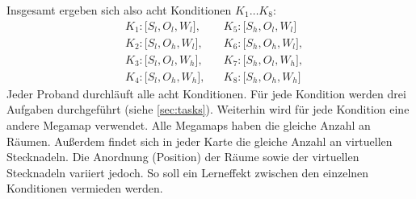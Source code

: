 \documentclass[
    draft=false,
    paper=a4,
    fontsize=12pt,
    twoside=false,
    captions=tableheading,
    british, ngerman,
]{scrartcl}
\begin{document}
Insgesamt ergeben sich also acht Konditionen $K_1 \dots K_8$:
\begin{align*}
    &K_1: \lbrack S_l, O_l, W_l \rbrack, && K_5: \lbrack S_h, O_l, W_l \rbrack\\
    &K_2: \lbrack S_l, O_h, W_l \rbrack, && K_6: \lbrack S_h, O_h, W_l \rbrack,\\
    &K_3: \lbrack S_l, O_l, W_h \rbrack, && K_7: \lbrack S_h, O_l, W_h \rbrack,\\
    &K_4: \lbrack S_l, O_h, W_h \rbrack, && K_8: \lbrack S_h, O_h, W_h \rbrack
\end{align*}
Jeder Proband durchläuft alle acht Konditionen.
Für jede Kondition werden drei Aufgaben durchgeführt (siehe \autoref{sec:tasks}).
Weiterhin wird für jede Kondition eine andere Megamap verwendet.
Alle Megamaps haben die gleiche Anzahl an Räumen.
Außerdem findet sich in jeder Karte die gleiche Anzahl an virtuellen Stecknadeln.
Die Anordnung (Position) der Räume sowie der virtuellen Stecknadeln variiert jedoch.
So soll ein Lerneffekt zwischen den einzelnen Konditionen vermieden werden.
\end{document}
